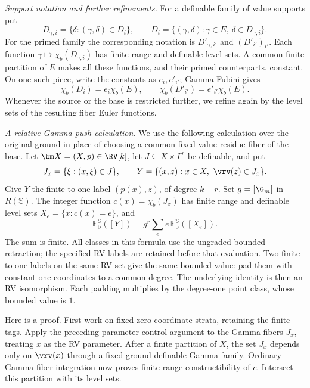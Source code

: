 \medskip
\noindent\emph{Support notation and further refinements.}
For a definable family of value supports put
\[
 D_{\gamma,i}=\{\delta:(\gamma,\delta)\in D_i\},\qquad
 D_i=\{(\gamma,\delta):\gamma\in E,\ \delta\in D_{\gamma,i}\}.
\]
For the primed family the corresponding notation is
$D'_{\gamma,i'}$ and $(D'_{i'})_{i'}$.
Each function $\gamma\mapsto\chi_b(D_{\gamma,i})$ has
finite range and definable level sets.
A common finite partition of $E$ makes all these functions,
and their primed counterparts, constant. On one such piece,
write the constants as $e_i,e'_{i'}$; Gamma Fubini gives
\[
 \chi_b(D_i)=e_i\chi_b(E),\qquad
 \chi_b(D'_{i'})=e'_{i'}\chi_b(E).
\]
Whenever the source or the base is restricted further,
we refine again by the level sets of the resulting fiber
Euler functions.

\medskip
\noindent\emph{A relative Gamma-push calculation.}
We use the following calculation over the original ground
in place of choosing a common fixed-value residue fiber
of the base.
Let $\bm X=(X,p)\in\RV[k]$, let
$J\subseteq X\times\Gamma^r$ be definable, and put
\[
 J_x=\{\xi:(x,\xi)\in J\},\qquad
 Y=\{(x,z):x\in X,\ \vrv(z)\in J_x\}.
\]
Give $Y$ the finite-to-one label $(p(x),z)$, of degree
$k+r$. Set $g=[\G_m]$ in $R(\mathbb S)$.
The integer function $c(x)=\chi_b(J_x)$ has finite range
and definable level sets $X_e=\{x:c(x)=e\}$, and
\begin{equation}\label{relative:Gamma:push}
 \mathbb E_{\mathrm b}^{\mathbb S}([Y])
       =g^r\sum_e e\,
               \mathbb E_{\mathrm b}^{\mathbb S}([X_e]).
\end{equation}
The sum is finite. All classes in this formula use the
ungraded bounded retraction; the specified RV labels are
retained before that evaluation.
Two finite-to-one labels on the same RV set give the same
bounded value: pad them with constant-one coordinates to
a common degree. The underlying identity is then an RV
isomorphism. Each padding multiplies by the degree-one
point class, whose bounded value is $1$.

Here is a proof. First work on fixed zero-coordinate
strata, retaining the finite tags.
Apply the preceding parameter-control argument to the
Gamma fibers $J_x$, treating $x$ as the RV parameter.
After a finite partition of $X$, the set $J_x$ depends only
on $\vrv(x)$ through a fixed ground-definable Gamma
family. Ordinary Gamma fiber integration now proves
finite-range constructibility of $c$.
Intersect this partition with its level sets.

